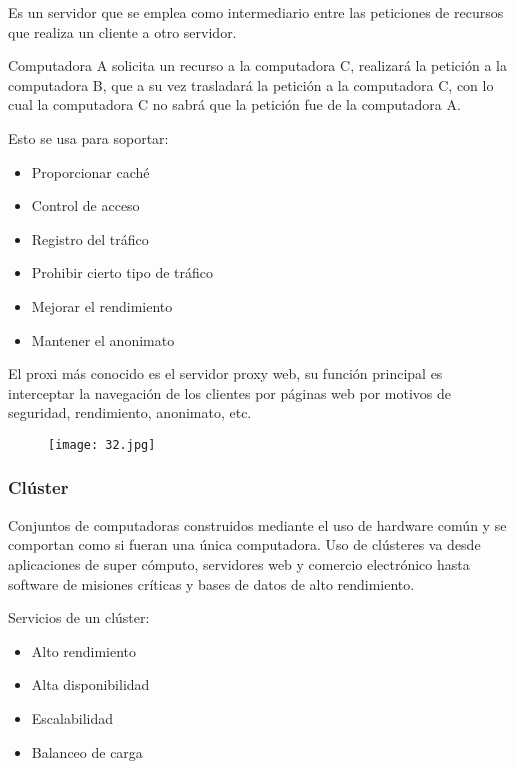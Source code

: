 Es un servidor que se emplea como intermediario entre las peticiones de recursos que realiza un cliente a otro servidor.

Computadora A solicita un recurso a la computadora C, realizará la petición a la computadora B, que a su vez trasladará la petición a la computadora C, con lo cual la computadora C no sabrá que la petición fue de la computadora A.

Esto se usa para soportar:

\begin{itemize}
	\item Proporcionar caché
	\item Control de acceso
	\item Registro del tráfico
	\item Prohibir cierto tipo de tráfico
	\item Mejorar el rendimiento
	\item Mantener el anonimato
\end{itemize}

El proxi más conocido es el servidor proxy web, su función principal es interceptar la navegación de los clientes por páginas web por motivos de seguridad, rendimiento, anonimato, etc.

\begin{figure}[h!]
		\centering
		{\texttt{[image: 32.jpg]}\par} \vspace{1cm}
\end{figure}

{\raggedright
\subsubsection{\textbf{Clúster}}
}

Conjuntos de computadoras construidos mediante el uso de hardware común y se comportan como si fueran una única computadora. Uso de clústeres va desde aplicaciones de super cómputo, servidores web y comercio electrónico hasta software de misiones críticas y bases de datos de alto rendimiento.

Servicios de un clúster:

\begin{itemize}
	\item Alto rendimiento
	\item Alta disponibilidad
	\item Escalabilidad
	\item Balanceo de carga
\end{itemize}

